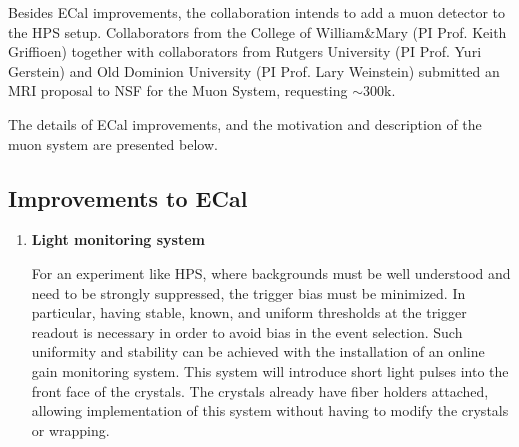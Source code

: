 Besides ECal improvements, the collaboration intends to add a muon detector to the HPS setup. Collaborators from the College 
of William\&Mary (PI Prof. Keith Griffioen) together with collaborators from Rutgers University (PI Prof. Yuri Gerstein) 
and Old Dominion University (PI Prof. Lary Weinstein) submitted an MRI proposal to NSF for the Muon System, requesting $\sim 300$k.  

The details of ECal improvements, and the motivation and description of the muon system are presented below. 

\subsection{Improvements to ECal}

\begin{enumerate}
\item {\bf Light monitoring system}

For an experiment like HPS, where backgrounds must be well understood and need to be strongly suppressed, the trigger bias must be minimized. In particular, having stable, known, and uniform thresholds at the trigger readout is necessary in order to avoid  bias in the 
event selection. Such uniformity and stability can be achieved with the installation of an online gain monitoring 
system. This system will introduce short light pulses into the front face of the crystals. The crystals already have fiber holders attached, allowing implementation of this system without having to modify the crystals or wrapping. 


\end{enumerate}
